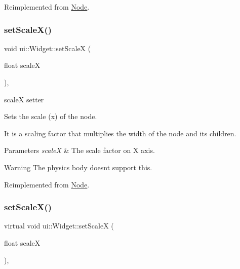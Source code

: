 Reimplemented from \hyperlink{classNode_a31f8130cfd505a5c327c4cc66fe4fa69}{Node}.

\mbox{\label{classui_1_1Widget_a7163529b3d2f436adec05d3ae6c3cb75}} 
\subsubsection{\texorpdfstring{set\+Scale\+X()}{setScaleX()}\hspace{0.1cm}{\footnotesize\ttfamily [1/2]}}
{\footnotesize\ttfamily void ui\+::\+Widget\+::set\+ScaleX (\begin{DoxyParamCaption}\item[{float}]{scaleX }\end{DoxyParamCaption})\hspace{0.3cm}{\ttfamily [override]}, {\ttfamily [virtual]}}



scaleX setter 

Sets the scale (x) of the node.

It is a scaling factor that multiplies the width of the node and its children.


\begin{DoxyParams}{Parameters}
{\em scaleX} & The scale factor on X axis.\\
\hline
\end{DoxyParams}
\begin{DoxyWarning}{Warning}
The physics body doesn\textquotesingle{}t support this. 
\end{DoxyWarning}


Reimplemented from \hyperlink{classNode_acf7f04074f7f49972e152788c090b877}{Node}.

\mbox{\label{classui_1_1Widget_a70186a0520486c8706b6326be6453fb4}} 
\subsubsection{\texorpdfstring{set\+Scale\+X()}{setScaleX()}\hspace{0.1cm}{\footnotesize\ttfamily [2/2]}}
{\footnotesize\ttfamily virtual void ui\+::\+Widget\+::set\+ScaleX (\begin{DoxyParamCaption}\item[{float}]{scaleX }\end{DoxyParamCaption})\hspace{0.3cm}{\ttfamily [override]}, {\ttfamily [virtual]}}



